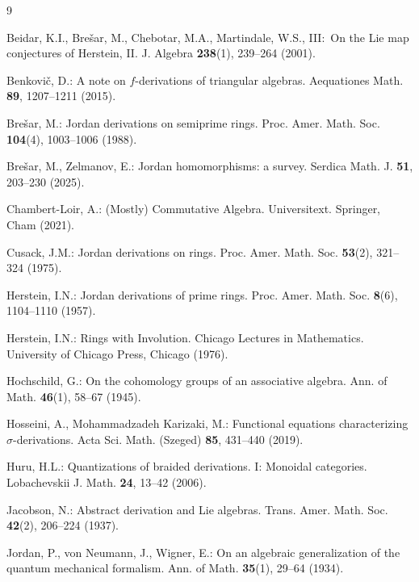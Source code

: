 \documentclass[]{interact}
\theoremstyle{plain}
\theoremstyle{definition}
\theoremstyle{remark}
\begin{document}
\begin{thebibliography}{9}

Beidar, K.I., Bre\v{s}ar, M., Chebotar, M.A., Martindale, W.S., III$\colon$ On the Lie map conjectures of Herstein, II. J. Algebra \textbf{238}(1), 239--264 (2001).

Benkovi\v{c}, D.: A note on $f$-derivations of triangular algebras. Aequationes Math. \textbf{89}, 1207--1211 (2015).

Bre\v{s}ar, M.: Jordan derivations on semiprime rings. Proc. Amer. Math. Soc. \textbf{104}(4), 1003--1006 (1988).

Bre\v{s}ar, M., Zelmanov, E.: Jordan homomorphisms: a survey. Serdica Math. J. \textbf{51}, 203--230 (2025).

Chambert-Loir, A.: (Mostly) Commutative Algebra. Universitext. Springer, Cham (2021).

Cusack, J.M.: Jordan derivations on rings. Proc. Amer. Math. Soc. \textbf{53}(2), 321--324 (1975).

Herstein, I.N.: Jordan derivations of prime rings. Proc. Amer. Math. Soc. \textbf{8}(6), 1104--1110 (1957).

Herstein, I.N.: Rings with Involution. Chicago Lectures in Mathematics. University of Chicago Press, Chicago (1976).

Hochschild, G.: On the cohomology groups of an associative algebra. Ann. of Math. \textbf{46}(1), 58--67 (1945).

Hosseini, A., Mohammadzadeh Karizaki, M.: Functional equations characterizing $\sigma$-derivations. Acta Sci. Math. (Szeged) \textbf{85}, 431--440 (2019).

Huru, H.L.: Quantizations of braided derivations. I: Monoidal categories. Lobachevskii J. Math. \textbf{24}, 13--42 (2006).

Jacobson, N.: Abstract derivation and Lie algebras. Trans. Amer. Math. Soc. \textbf{42}(2), 206--224 (1937).

Jordan, P., von Neumann, J., Wigner, E.: On an algebraic generalization of the quantum mechanical formalism. Ann. of Math. \textbf{35}(1), 29--64 (1934).


\end{thebibliography}
\end{document}
